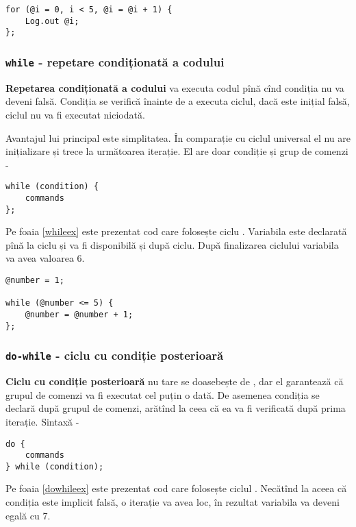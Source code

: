 \begin{lstlisting}[caption=Ciclu universal, label=uniloopex]
for (@i = 0, i < 5, @i = @i + 1) {
	Log.out @i;
};
\end{lstlisting}

\subsubsection{\lstinline|while| - repetare condiționată a codului}

{\bf Repetarea condiționată a codului} va executa codul pînă cînd condiția nu va deveni falsă. Condiția se verifică înainte de a executa ciclul, dacă este inițial falsă, ciclul nu va fi executat niciodată.

Avantajul lui principal este simplitatea. În comparație cu ciclul universal el nu are inițializare și trece la următoarea iterație. El are doar condiție și grup de comenzi -
\begin{lstlisting}[numbers=none]
while (condition) {
	commands
};
\end{lstlisting}

Pe foaia \ref{whileex} este prezentat cod care folosește ciclu . Variabila  este declarată pînă la ciclu și va fi disponibilă și după ciclu. După finalizarea ciclului variabila  va avea valoarea 6.

\begin{lstlisting}[caption=Ciclu while, label=whileex]
@number = 1;

while (@number <= 5) {
	@number = @number + 1;
};
\end{lstlisting}

\subsubsection{\lstinline|do-while| - ciclu cu condiție posterioară}

{\bf Ciclu cu condiție posterioară} nu tare se doasebește de , dar el garantează că grupul de comenzi va fi executat cel puțin o dată. De asemenea condiția se declară după grupul de comenzi, arătînd la ceea că ea va fi verificată după prima iterație. Sintaxă -
\begin{lstlisting}[numbers=none]
do {
	commands
} while (condition);
\end{lstlisting}

Pe foaia \ref{dowhileex} este prezentat cod care folosește ciclul . Necătînd la aceea că condiția este implicit falsă, o iterație va avea loc, în rezultat variabila  va deveni egală cu 7.

